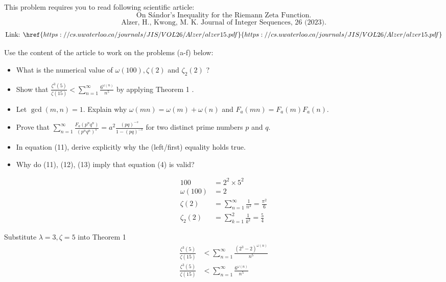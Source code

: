 \documentclass{article}
\begin{document}
\begin{custom-big}[Problem C.2]
This problem requires you to read following scientific article:
\[
\text{On Sándor's Inequality for the Riemann Zeta Function.}\]
\[\text{Alzer, H., Kwong, M. K. Journal of Integer Sequences, 26 (2023).}\]
\[\text{Link: }\href{https://cs.uwaterloo.ca/journals/JIS/VOL26/Alzer/alzer15.pdf}{https://cs.uwaterloo.ca/journals/JIS/VOL26/Alzer/alzer15.pdf}\]

Use the content of the article to work on the problems (a-f) below:

\begin{itemize}
\item[(a)] What is the numerical value of $\omega(100), \zeta(2)$ and $\zeta_2(2)$ ?
\item[(b)] Show that $\displaystyle\frac{\zeta^3(5)}{\zeta(15)}<\displaystyle\sum_{n=1}^{\infty} \frac{6^{\omega(n)}}{n^5}$ by applying Theorem 1 .
\item[(c)] Let $\operatorname{gcd}(m, n)=1$. Explain why $\omega(m n)=\omega(m)+\omega(n)$ and $F_a(m n)=F_a(m) F_a(n)$.
\item[(d)] Prove that $\displaystyle\sum_{n=1}^{\infty} \displaystyle\frac{F_a\left(p^n q^n\right)}{\left(p^n q^n\right)^s}=a^2 \displaystyle\frac{(p q)^{-s}}{1-(p q)^{-s}}$ for two distinct prime numbers $p$ and $q$.
\item[(e)] In equation (11), derive explicitly why the (left/first) equality holds true.
\item[(f)] Why do (11), (12), (13) imply that equation (4) is valid?
\end{itemize}
\end{custom-big}

\begin{solution}
\begin{align*}
    100&=2^2\times 5^2\\
    \omega(100)&=2\\
    \zeta(2)&=\displaystyle\sum_{n=1}^{\infty} \frac{1}{n^2}=\frac{\pi^2}{6}\\
    \zeta_2(2)&=\displaystyle\sum_{k=1}^2 \frac{1}{k^2}=\frac 54
\end{align*}
\end{solution}

\begin{solution}
Substitute $\lambda=3,\zeta=5$ into Theorem 1
\begin{align*}
    \frac{\zeta^3(5)}{\zeta(15)}&<\sum_{n=1}^{\infty} \frac{\left(2^3-2\right)^{\omega(n)}}{n^5}\\
    \frac{\zeta^3(5)}{\zeta(15)}&<\sum_{n=1}^{\infty} \frac{6^{\omega(n)}}{n^5}
\end{align*}
\end{solution}
\end{document}
